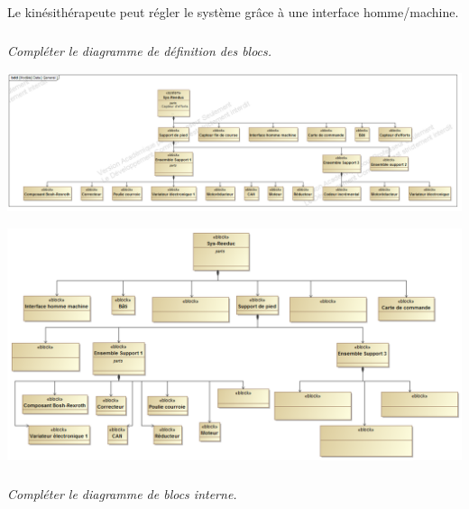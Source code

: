 \documentclass[10pt]{article}
\begin{document}
Le kinésithérapeute peut régler le système grâce à une interface homme/machine.

\fi

\subparagraph{}
\textit{Compléter le diagramme de définition des blocs.}

\ifprof
\begin{corrige}
\begin{center}
\includegraphics[width=\textwidth]{images/BDD_Cor}
\end{center}
\end{corrige}
\else
\begin{center}
\includegraphics[width=\textwidth]{images/bdd}
\end{center}
\fi


\subparagraph{}
\textit{Compléter le diagramme de blocs interne.}
\end{document}
